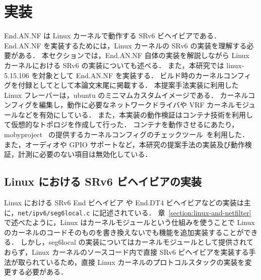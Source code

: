 \section{実装}
\label{section:implementation}
End.AN.NF は Linux カーネルで動作する SRv6 ビヘイビアである．
End.AN.NF を実装するためには，Linux カーネルの SRv6 の実装を理解する必要がある．
本セクションでは，End.AN.NF 自体の実装を解説しながら Linux カーネルにおける SRv6 の実装についても述べる．
また，本研究では linux-5.15.106 を対象として End.AN.NF を実装する．
ビルド時のカーネルコンフィグを付録としてとして本論文末尾に掲載する．
本提案手法実装に利用した Linux フレーバーは，ubuntu のミニマムカスタムイメージである．
カーネルコンフィグを編集し，動作に必要なネットワークドライバや VRF カーネルモジュールなどを有効にしている．
また，本実装の動作検証はコンテナ技術を利用して仮想的なトポロジを作成して行った．
コンテナを動作させるにあたり，mobyproject~\cite{moby} の提供するカーネルコンフィグのチェックツール~\cite{mobysh}を利用した．
また，オーディオや GPIO サポートなど，本研究の提案手法の実装及び動作検証，計測に必要のない項目は無効化している．


\subsection{Linux における SRv6 ビヘイビアの実装}
\label{sbsection:linux-packet-forwarding}
Linux における SRv6 End ビヘイビア や End.DT4 ビヘイビアなどの実装は主に，\texttt{net/ipv6/seg6local.c} に記述されている．
章~\ref{section:linux-and-netfilter} で述べたように，Linux はカーネルモジュールという仕組みを使うことで Linux のカーネルのコードそのものを書き換えないでも機能を追加実装することができる．
しかし，seg6local の実装についてはカーネルモジュールとして提供されておらず，Linux カーネルのソースコード内で直接 SRv6 ビヘイビアを実装する手法が取られているため，直接 Linux カーネルのプロトコルスタックの実装を変更する必要がある．


